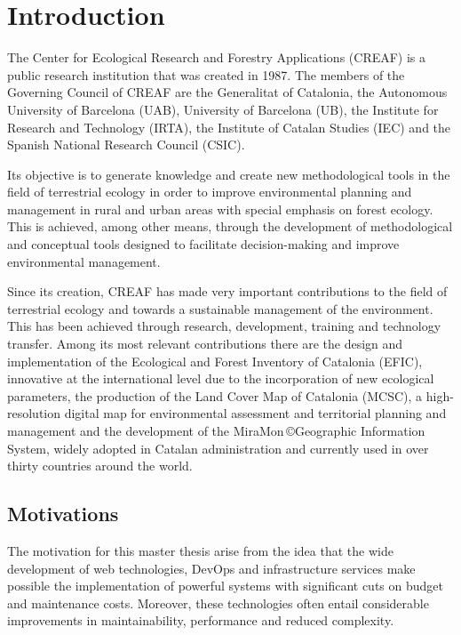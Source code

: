 \chapter{Introduction}

The Center for Ecological Research and Forestry Applications (CREAF) is a public research institution that was created in 1987.  The members of the Governing Council of CREAF are the Generalitat of Catalonia, the Autonomous University of Barcelona (UAB), University of Barcelona (UB), the Institute for Research and Technology (IRTA), the Institute of Catalan Studies (IEC) and the Spanish National Research Council (CSIC).

Its objective is to generate knowledge and create new methodological tools in the field of terrestrial ecology in order to improve environmental planning and management in rural and urban areas with special emphasis on forest ecology. This is achieved, among other means, through the development of methodological and conceptual tools designed to facilitate decision-making and improve environmental management.

Since its creation, CREAF has made very important contributions to the field of terrestrial ecology and towards a sustainable management of the environment. This has been achieved through research, development, training and technology transfer. Among its most relevant contributions there are the design and implementation of the Ecological and Forest Inventory of Catalonia (EFIC), innovative at the international level due to the incorporation of new ecological parameters, the production of the Land Cover Map of Catalonia (MCSC), a high-resolution digital map for environmental assessment and territorial planning and management and the development of the MiraMon \copyright  Geographic Information System, widely adopted in Catalan administration and currently used in over thirty countries around the world.


\section{Motivations}

The motivation for this master thesis arise from the idea that the wide development of web technologies, DevOps and infrastructure services make possible the implementation of powerful systems with significant cuts on budget and maintenance costs. Moreover, these technologies often entail considerable improvements in maintainability, performance and reduced complexity.

